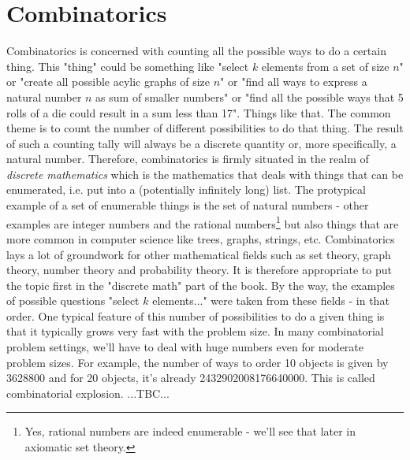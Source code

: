 \chapter{Combinatorics}
Combinatorics is concerned with counting all the possible ways to do a certain thing. This "thing" could be something like "select $k$ elements from a set of size $n$" or "create all possible acylic graphs of size $n$" or "find all ways to express a natural number $n$ as sum of smaller numbers" or "find all the possible ways that 5 rolls of a die could result in a sum less than 17". Things like that. The common theme is to count the number of different possibilities to do that thing. The result of such a counting tally will always be a discrete quantity or, more specifically, a natural number. Therefore, combinatorics is firmly situated in the realm of \emph{discrete mathematics} which is the mathematics that deals with things that can be enumerated, i.e. put into a (potentially infinitely long) list. The protypical example of a set of enumerable things is the set of natural numbers - other examples are integer numbers and the rational numbers\footnote{Yes, rational numbers are indeed enumerable - we'll see that later in axiomatic set theory.} but also things that are more common in computer science like trees, graphs, strings, etc. Combinatorics lays a lot of groundwork for other mathematical fields such as set theory, graph theory, number theory and probability theory. It is therefore appropriate to put the topic first in the "discrete math" part of the book. By the way, the examples of possible questions "select $k$ elements..." were taken from these fields - in that order. One typical feature of this number of possibilities to do a given thing is that it typically grows very fast with the problem size. In many combinatorial problem settings, we'll have to deal with huge numbers even for moderate problem sizes. For example, the number of ways to order 10 objects is given by 3628800 and for 20 objects, it's already 2432902008176640000. This is called combinatorial explosion. ...TBC...



